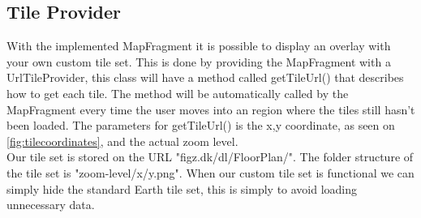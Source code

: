 \subsection*{Tile Provider}
With the implemented MapFragment it is possible to display an overlay with your own custom tile set. This is done by providing the MapFragment with a UrlTileProvider\citep{tilecoordinates}, this class will have a method called getTileUrl() that describes how to get each tile. The method will be automatically called by the MapFragment every time the user moves into an region where the tiles still hasn't been loaded. The parameters for getTileUrl() is the x,y coordinate, as seen on \autoref{fig:tilecoordinates}, and the actual zoom level.\\
Our tile set is stored on the URL "figz.dk/dl/FloorPlan/". The folder structure of the tile set is "zoom-level/x/y.png". When our custom tile set is functional we can simply hide the standard Earth tile set, this is simply to avoid loading unnecessary data. 
